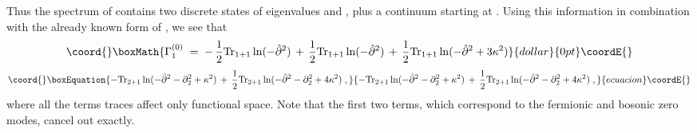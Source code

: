 \documentclass[a4paper,12pt]{article}
\begin{document}
Thus the spectrum of \coordHE{} contains  two discrete states of 
eigenvalues \coordHE{} and \coordHE{}, plus a continuum starting at
\coordHE{}.
Using this information in combination with the already known form of
\coordHE{}, we see that
$$\coord{}\boxMath{
\Gamma_1^{(0)}\;=\; - \,\frac{1}{2} {\rm Tr}_{1+1}\ln(-{\hat\partial}^2)
\,+\,\frac{1}{2} {\rm Tr}_{1+1}\ln(-{\hat\partial}^2)
\,+\,\frac{1}{2} {\rm Tr}_{1+1}\ln(-{\hat\partial}^2 + 3 \kappa^2)
}{dollar}{0pt}\coordE{}$$
\begin{equation}\coord{}\boxEquation{
-{\rm Tr}_{2+1}\ln(-{\hat \partial}^2 - \partial_2^2 + \kappa^2) 
\,+\, \frac{1}{2}{\rm Tr}_{2+1}\ln(-{\hat \partial}^2 - \partial_2^2 + 4 \kappa^2) \;, 
}{
-{\rm Tr}_{2+1}\ln(-{\hat \partial}^2 - \partial_2^2 + \kappa^2) 
\,+\, \frac{1}{2}{\rm Tr}_{2+1}\ln(-{\hat \partial}^2 - \partial_2^2 + 4 \kappa^2) \;, 
}{ecuacion}\coordE{}\end{equation}
where all the terms traces affect only functional space.
Note that the first two terms, which correspond to the fermionic
and bosonic zero modes, cancel out exactly. 



\end{document}
